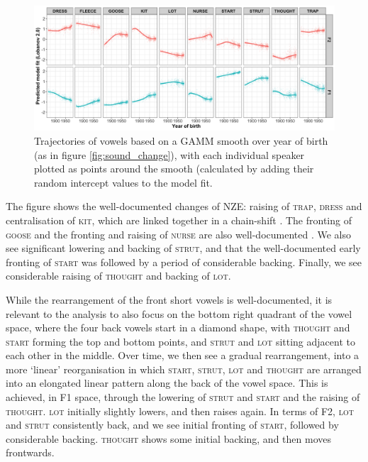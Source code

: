 \documentclass[review]{elsarticle} %
\begin{document}
\begin{figure}[!t]
\includegraphics[width=\textwidth]{Figures/sound_change_gam.png}
\caption{Trajectories of vowels based on a GAMM smooth over year of birth (as in figure \ref{fig:sound_change}), with each individual speaker plotted as points around the smooth (calculated by adding their random intercept values to the model fit.}
\label{fig:sound_change_gam}
\end{figure}

The figure shows the well-documented changes of NZE:  raising of \textsc{trap}, \textsc{dress} and centralisation of \textsc{kit}, which are linked together in a chain-shift \citep{hay2015tracking}.  The fronting of \textsc{goose} and the fronting and raising of \textsc{nurse} are also well-documented \citep{maclagan2009u, maclagan2017investigating}.  We also see significant lowering and backing of \textsc{strut}, and that the well-documented early fronting of \textsc{start} \citep{gordon2004new} was followed by a period of considerable backing.  Finally, we see considerable raising of \textsc{thought} and backing of \textsc{lot}.

While the rearrangement of the front short vowels is well-documented, it is relevant to the analysis to also focus on the bottom right quadrant of the vowel space, where the four back vowels start in a diamond shape, with \textsc{thought} and \textsc{start} forming the top and bottom points, and \textsc{strut} and \textsc{lot} sitting adjacent to each other in the middle.
Over time, we then see a gradual rearrangement, into a more `linear' reorganisation in which \textsc{start}, \textsc{strut}, \textsc{lot} and \textsc{thought} are arranged into an elongated linear pattern along the back of the vowel space.   This is achieved, in F1 space, through the lowering of \textsc{strut} and \textsc{start} and the raising of \textsc{thought}.  \textsc{lot} initially slightly lowers, and then raises again. In terms of F2,  \textsc{lot} and \textsc{strut} consistently back, and we see initial fronting of \textsc{start}, followed by considerable backing.  \textsc{thought} shows some initial backing, and then moves frontwards.   
\end{document}
